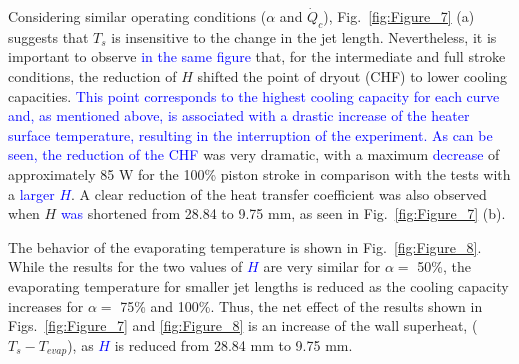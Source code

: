 \documentclass[review,preprint,12pt]{elsarticle}
\begin{document}
Considering similar operating conditions ($\alpha$ and $\dot{Q}_{c}$), Fig.~\ref{fig:Figure_7} (a) suggests that $T_{s}$ is insensitive to the change in the jet length. Nevertheless, it is important to observe \textcolor{blue}{in the same figure} that, for the intermediate and full stroke conditions, the reduction of $H$ shifted the point of dryout (CHF) to lower cooling capacities. \textcolor{blue}{This point corresponds to the highest cooling capacity for each curve and, as mentioned above, is associated with a drastic increase of the heater surface temperature, resulting in the interruption of the experiment. As can be seen, the reduction of the CHF} was very dramatic, with a maximum \textcolor{blue}{decrease} of approximately 85 W for the 100\% piston stroke in comparison with the tests with a  \textcolor{blue}{larger $H$}. A clear reduction of the heat transfer coefficient was also observed when $H$ \textcolor{blue}{was} shortened from 28.84 to 9.75 mm, as seen in Fig.~\ref{fig:Figure_7} (b).

The behavior of the evaporating temperature is shown in Fig.~\ref{fig:Figure_8}. While the results for the two values of  \textcolor{blue}{$H$} are very similar for $\alpha =$ 50\%, the evaporating temperature for smaller jet lengths is reduced as the cooling capacity increases for $\alpha =$ 75\% and 100\%. %
Thus, the net effect of the results shown in Figs.~\ref{fig:Figure_7} and \ref{fig:Figure_8} is an increase of the wall superheat, ($T_{s} - T_{evap}$), as  \textcolor{blue}{$H$} is reduced from 28.84 mm to 9.75 mm. 




\end{document}
